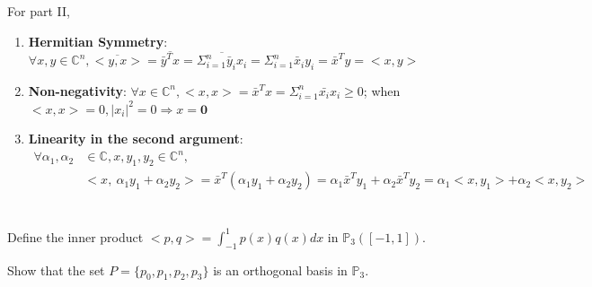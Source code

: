 \documentclass{article}
\theoremstyle{definition} %
\newcommand{\CC}{\mathbb{C}}
\newcommand{\PP}{\mathbb{P}}
\begin{document}
For part II, 

\begin{enumerate}[label=(\alph*)]
	\item \textbf{Hermitian Symmetry}: $\forall x, y\in \CC^n, \overline{<y, x>} = \overline{\bar{y}^Tx} = \overline{\Sigma_{i=1}^n\bar y_ix_i} = \Sigma_{i=1}^n\bar x_iy_i = \bar{x}^Ty = <x, y>$
	\item \textbf{Non-negativity}: $\forall x\in \CC^n, <x,x> = \bar{x}^Tx = \Sigma_{i=1}^n\bar{x_i}x_i \ge 0$; when $<x,x>=0, |x_i|^2 = 0 \Rightarrow x=\mathbf 0$
	\item \textbf{Linearity in the second argument}:
	\begin{align*}
		\forall \alpha_1, \alpha_2& \in \CC, x, y_1, y_2 \in \CC^n,\\
		&<x,\ \alpha_1 y_1 + \alpha_2 y_2> = \bar{x}^T(\alpha_1 y_1 + \alpha_2 y_2) = \alpha_1 \bar{x}^T{y_1} + \alpha_2 \bar{x}^T{y_2} = \alpha_1 <x, y_1> + \alpha_2 <x, y_2>
	\end{align*}
\end{enumerate}

\section{}
Define the inner product $<p, q> = \int_{-1}^1 p(x)q(x)dx$ in $\PP_3([-1,1])$.

Show that the set $P = \{p_0, p_1, p_2, p_3\}$ is an orthogonal basis in $\PP_3$.
\end{document}
